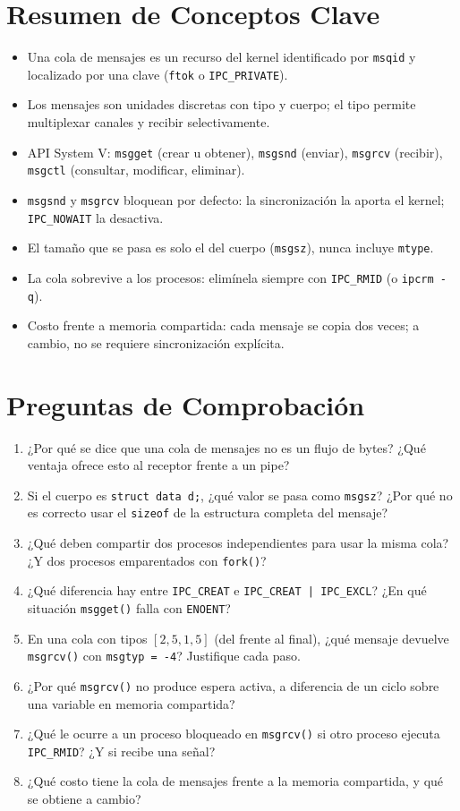 \documentclass[12pt,a4paper]{article}
\begin{document}
\section{Resumen de Conceptos Clave}
\begin{itemize}
    \item Una cola de mensajes es un recurso del kernel identificado por \texttt{msqid} y localizado por una clave (\texttt{ftok} o \texttt{IPC\_PRIVATE}).
    \item Los mensajes son unidades discretas con tipo y cuerpo; el tipo permite multiplexar canales y recibir selectivamente.
    \item API System V: \texttt{msgget} (crear u obtener), \texttt{msgsnd} (enviar), \texttt{msgrcv} (recibir), \texttt{msgctl} (consultar, modificar, eliminar).
    \item \texttt{msgsnd} y \texttt{msgrcv} bloquean por defecto: la sincronización la aporta el kernel; \texttt{IPC\_NOWAIT} la desactiva.
    \item El tamaño que se pasa es solo el del cuerpo (\texttt{msgsz}), nunca incluye \texttt{mtype}.
    \item La cola sobrevive a los procesos: elimínela siempre con \texttt{IPC\_RMID} (o \texttt{ipcrm -q}).
    \item Costo frente a memoria compartida: cada mensaje se copia dos veces; a cambio, no se requiere sincronización explícita.
\end{itemize}

\section{Preguntas de Comprobación}
\begin{enumerate}
    \item ¿Por qué se dice que una cola de mensajes no es un flujo de bytes? ¿Qué ventaja ofrece esto al receptor frente a un pipe?
    \item Si el cuerpo es \texttt{struct data d;}, ¿qué valor se pasa como \texttt{msgsz}? ¿Por qué no es correcto usar el \texttt{sizeof} de la estructura completa del mensaje?
    \item ¿Qué deben compartir dos procesos independientes para usar la misma cola? ¿Y dos procesos emparentados con \texttt{fork()}?
    \item ¿Qué diferencia hay entre \texttt{IPC\_CREAT} e \texttt{IPC\_CREAT | IPC\_EXCL}? ¿En qué situación \texttt{msgget()} falla con \texttt{ENOENT}?
    \item En una cola con tipos $[2, 5, 1, 5]$ (del frente al final), ¿qué mensaje devuelve \texttt{msgrcv()} con \texttt{msgtyp = -4}? Justifique cada paso.
    \item ¿Por qué \texttt{msgrcv()} no produce espera activa, a diferencia de un ciclo sobre una variable en memoria compartida?
    \item ¿Qué le ocurre a un proceso bloqueado en \texttt{msgrcv()} si otro proceso ejecuta \texttt{IPC\_RMID}? ¿Y si recibe una señal?
    \item ¿Qué costo tiene la cola de mensajes frente a la memoria compartida, y qué se obtiene a cambio?
\end{enumerate}
\end{document}
